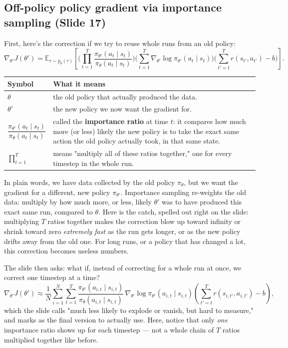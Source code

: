 \documentclass[11pt]{article}
\begin{document}
\subsection{Off-policy policy gradient via importance sampling (Slide 17)}
First, here's the correction if we try to reuse whole runs from an old policy:
$$\nabla_{\theta'}J(\theta') = \mathbb{E}_{\tau\sim p_\theta(\tau)}\left[\Big(\prod_{t=1}^{T}\frac{\pi_{\theta'}(a_t\mid s_t)}{\pi_\theta(a_t\mid s_t)}\Big)\Big(\sum_{t=1}^{T}\nabla_{\theta'}\log\pi_{\theta'}(a_t\mid s_t)\Big)\Big(\sum_{t'=t}^{T} r(s_{t'},a_{t'}) - b\Big)\right].$$
\begin{center}
\begin{tabular}{@{} >{\raggedright\arraybackslash}p{} >{\raggedright\arraybackslash}p{} @{}}
\toprule
\textbf{Symbol} & \textbf{What it means} \\
\midrule
$\theta$ & the old policy that actually produced the data. \\
$\theta'$ & the new policy we now want the gradient for. \\
$\dfrac{\pi_{\theta'}(a_t\mid s_t)}{\pi_\theta(a_t\mid s_t)}$ & called the \textbf{importance ratio} at time $t$: it compares how much more (or less) likely the new policy is to take the exact same action the old policy actually took, in that same state. \\
$\prod_{t=1}^{T}$ & means "multiply all of these ratios together," one for every timestep in the whole run. \\
\bottomrule
\end{tabular}
\end{center}

In plain words, we have data collected by the old policy $\pi_\theta$, but we want the gradient for a different, new policy $\pi_{\theta'}$. Importance sampling re-weights the old data: multiply by how much more, or less, likely $\theta'$ was to have produced this exact same run, compared to $\theta$. Here is the catch, spelled out right on the slide: multiplying $T$ ratios together makes the correction blow up toward infinity or shrink toward zero \emph{extremely fast} as the run gets longer, or as the new policy drifts away from the old one. For long runs, or a policy that has changed a lot, this correction becomes useless numbers.

The slide then asks: what if, instead of correcting for a whole run at once, we correct one timestep at a time?
$$\nabla_{\theta'}J(\theta') \approx \frac{1}{N}\sum_{i=1}^{N}\sum_{t=1}^{T}\frac{\pi_{\theta'}(a_{i,t}\mid s_{i,t})}{\pi_\theta(a_{i,t}\mid s_{i,t})}\,\nabla_{\theta'}\log\pi_{\theta'}(a_{i,t}\mid s_{i,t})\left(\sum_{t'=t}^{T} r(s_{i,t'},a_{i,t'}) - b\right),$$
which the slide calls "much less likely to explode or vanish, but hard to measure," and marks as the final version to actually use. Here, notice that only \emph{one} importance ratio shows up for each timestep --- not a whole chain of $T$ ratios multiplied together like before.
\end{document}
